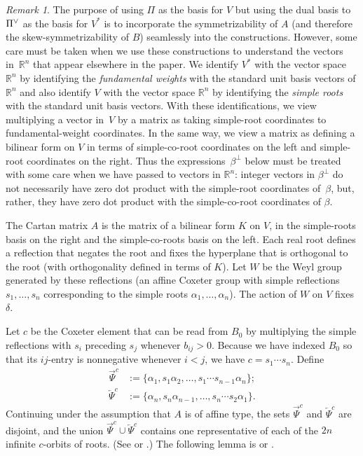 \documentclass{amsart}
\theoremstyle{definition}
\theoremstyle{remark}
\newtheorem{remark}[proposition]{Remark}
\numberwithin{equation}{section}
\newcommand{\reals}{\mathbb R}
\newcommand{\set}[1]{{\lbrace #1 \rbrace}}
\newcommand{\ck}{\spcheck}
\newcommand{\0}{{\mathbf{0}}}
\newcommand{\SimplesChar}{\Pi}
\newcommand{\Simples}{\SimplesChar}
\newcommand{\TravInfChar}{\Psi}
\newcommand{\TravProj}[1]{\overrightarrow{\TravInfChar}^{#1}}
\newcommand{\TravInj}[1]{\overleftarrow{\TravInfChar}^{#1}}
\begin{document}
\begin{remark}\label{danger: co-roots}
The purpose of using $\Simples$ as the basis for $V$ but using the dual basis to $\Simples\ck$ as the basis for $V^*$ is to incorporate the symmetrizability of $A$ (and therefore the skew-symmetrizability of $B$) seamlessly into the constructions.
However, some care must be taken when we use these constructions to understand the vectors in~$\reals^n$ that appear elsewhere in the paper.
We identify $V^*$ with the vector space $\reals^n$ by identifying the \emph{fundamental weights} with the standard unit basis vectors of $\reals^n$ and also identify $V$ with the vector space $\reals^n$ by identifying the \emph{simple roots} with the standard unit basis vectors.
With these identifications, we view multiplying a vector in~$V$ by a matrix as taking simple-root coordinates to fundamental-weight coordinates.
In the same way, we view a matrix as defining a bilinear form on $V$ in terms of simple-co-root coordinates on the left and simple-root coordinates on the right.
Thus the expressions~$\beta^\perp$ below must be treated with some care when we have passed to vectors in $\reals^n$:
integer vectors in $\beta^\perp$ do not necessarily have zero dot product with the simple-root coordinates of~$\beta$, but, rather, they have zero dot product with the simple-co-root coordinates of $\beta$.
\end{remark}

The Cartan matrix $A$ is the matrix of a bilinear form $K$ on $V$, in the simple-roots basis on the right and the simple-co-roots basis on the left.
Each real root defines a reflection that negates the root and fixes the hyperplane that is orthogonal to the root (with orthogonality defined in terms of $K$).
Let $W$ be the Weyl group generated by these reflections (an affine Coxeter  group with simple reflections $s_1,\ldots,s_n$ corresponding to the simple roots $\alpha_1,\ldots,\alpha_n$).
The action of $W$ on $V$ fixes~$\delta$.

Let $c$ be the Coxeter element that can be read from $B_0$ by multiplying the simple reflections with $s_i$ preceding $s_j$ whenever $b_{ij}>0$.
Because we have indexed $B_0$ so that its $ij$-entry is nonnegative whenever $i<j$, we have $c=s_1\cdots s_n$. 
Define
\begin{align}
\label{rep->}
\TravProj{c}&:=\set{\alpha_1,s_1\alpha_2,\ldots,s_1\cdots s_{n-1}\alpha_n};\\
\label{rep<-}
\TravInj{c}&:=\set{\alpha_n,s_n\alpha_{n-1},\ldots,s_n\cdots s_2\alpha_1}.
\end{align}%
Continuing under the assumption that $A$ is of affine type, the sets $\TravProj{c}$ and $\TravInj{c}$ are disjoint, and the union $\TravProj{c}\cup\TravInj{c}$ contains one representative of each of the $2n$ infinite $c$-orbits of roots.
(See \cite[Chapter~1]{Dlab-Ringel} or \cite[Theorem~1.2]{afforb}.)
The following lemma is \cite[Lemma~1.6]{Dlab-Ringel} or \cite[Lemma~4.1]{afforb}.
\end{document}
